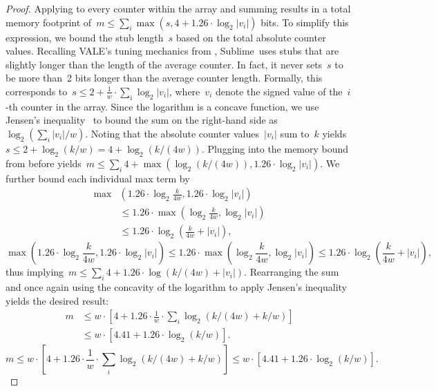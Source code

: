 \documentclass[sigconf]{acmart}
\newcommand{\sketch}{Sublime}
\newcommand{\counterencodingabbrv}{VALE}
\begin{document}
\begin{proof}
    Applying  to every counter
    within the array and summing results in a total memory footprint of~$m \leq
    \sum_i \max(s, 4+1.26 \cdot \log_2 |v_i|)$ bits. To simplify this
    expression, we bound the stub length~$s$ based on the total absolute
    counter values. Recalling \counterencodingabbrv's tuning mechanics from
    ,
    \sketch\ uses stubs that are slightly longer than the length of the average
    counter. In fact, it never sets~$s$ to be more than~2 bits longer than the
    average counter length. Formally, this corresponds to~$s \leq 2 +
    \frac{1}{w} \cdot \sum_i \log_2 |v_i|$, where~$v_i$ denote the signed value
    of the~$i${\nobreakdash-}th counter in the array. Since the logarithm is a
    concave function, we use Jensen's inequality~\cite{Jensen} to bound the sum
    on the right-hand side as~$\log_2(\sum_i |v_i|/w)$. Noting that the
    absolute counter values~$|v_i|$ sum to~$k$ yields $s \leq 2+\log_2(k/w) = 4
    + \log_2(k/(4w))$. Plugging into the memory bound from before yields~$m
    \leq \sum_i 4 + \max(\log_2 (k/(4w)), 1.26 \cdot \log_2 |v_i|)$. We further
    bound each individual max term by 
    \ifnotods
    \begin{align*}
      \max & \left( 1.26 \cdot \log_2 \frac{k}{4w}, 1.26 \cdot \log_2|v_i| \right) \\
      & \leq 1.26 \cdot \max\left( \log_2 \frac{k}{4w}, \log_2|v_i| \right) \\ 
      & \leq 1.26 \cdot \log_2\left( \frac{k}{4w} + |v_i| \right),
    \end{align*}
    \else
    $$ \max\left( 1.26 \cdot \log_2 \frac{k}{4w}, 1.26 \cdot \log_2|v_i| \right) \leq 1.26 \cdot \max\left( \log_2 \frac{k}{4w}, \log_2|v_i| \right) \leq 1.26 \cdot \log_2\left( \frac{k}{4w} + |v_i| \right), $$
    \fi
    thus implying~$m \leq \sum_i 4 + 1.26 \cdot \log(k/(4w) + |v_i|)$.
    Rearranging the sum and once again using the concavity of the logarithm to
    apply Jensen's inequality yields the desired result:
    \ifnotods
    \begin{align*}
      m &\leq w \cdot \left[4 + 1.26 \cdot \frac{1}{w} \cdot \sum_i \log_2(k/(4w)+k/w) \right] \\ 
      & \leq w \cdot \left[ 4.41 + 1.26 \cdot \log_2 (k/w) \right]. 
    \end{align*}
    \else
    $$ m \leq w \cdot \left[4 + 1.26 \cdot \frac{1}{w} \cdot \sum_i \log_2(k/(4w)+k/w) \right] \leq w \cdot \left[ 4.41 + 1.26 \cdot \log_2 (k/w) \right]. $$
    \fi
    \vspace{-8pt}
\end{proof}
\end{document}

